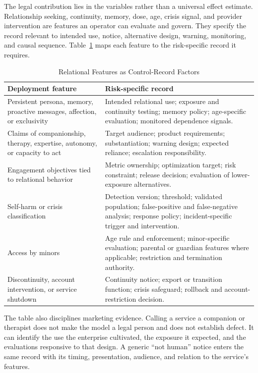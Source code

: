 The legal contribution lies in the variables rather than a universal effect estimate. Relationship seeking, continuity, memory, dose, age, crisis signal, and provider intervention are features an operator can evaluate and govern. They specify the record relevant to intended use, notice, alternative design, warning, monitoring, and causal sequence. Table~\ref{tab:relational-record} maps each feature to the risk-specific record it requires.

\begin{table}[htbp]
\centering
\caption{Relational Features as Control-Record Factors}
\label{tab:relational-record}
\small
\begin{tabularx}{\textwidth}{>{\raggedright\arraybackslash}p{} X}
\toprule
Deployment feature & Risk-specific record \\
\midrule
Persistent persona, memory, proactive messages, affection, or exclusivity & Intended relational use; exposure and continuity testing; memory policy; age-specific evaluation; monitored dependence signals. \\
Claims of companionship, therapy, expertise, autonomy, or capacity to act & Target audience; product requirements; substantiation; warning design; expected reliance; escalation responsibility. \\
Engagement objectives tied to relational behavior & Metric ownership; optimization target; risk constraint; release decision; evaluation of lower-exposure alternatives. \\
Self-harm or crisis classification & Detection version; threshold; validated population; false-positive and false-negative analysis; response policy; incident-specific trigger and intervention. \\
Access by minors & Age rule and enforcement; minor-specific evaluation; parental or guardian features where applicable; restriction and termination authority. \\
Discontinuity, account intervention, or service shutdown & Continuity notice; export or transition function; crisis safeguard; rollback and account-restriction decision. \\
\bottomrule
\end{tabularx}
\end{table}

The table also disciplines marketing evidence. Calling a service a companion or therapist does not make the model a legal person and does not establish defect. It can identify the use the enterprise cultivated, the exposure it expected, and the evaluations responsive to that design. A generic ``not human'' notice enters the same record with its timing, presentation, audience, and relation to the service's features.

